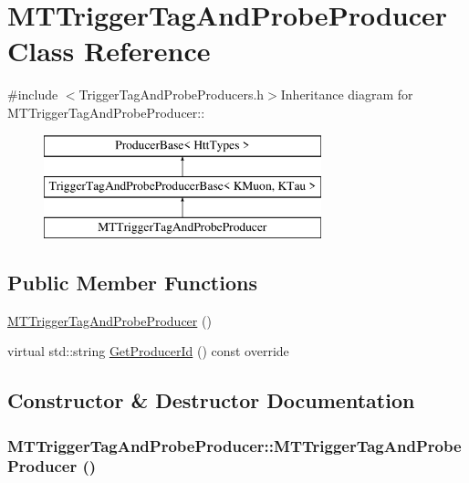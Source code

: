\hypertarget{classMTTriggerTagAndProbeProducer}{
\section{MTTriggerTagAndProbeProducer Class Reference}
\label{classMTTriggerTagAndProbeProducer}
}


{\ttfamily \#include $<$TriggerTagAndProbeProducers.h$>$}Inheritance diagram for MTTriggerTagAndProbeProducer::\begin{figure}[H]
\begin{center}
\leavevmode
\includegraphics[height=3cm]{classMTTriggerTagAndProbeProducer}
\end{center}
\end{figure}
\subsection*{Public Member Functions}
\begin{DoxyCompactItemize}
\item 
\hyperlink{classMTTriggerTagAndProbeProducer_a6662f0b3c23290d8247cc5fc4a3ed9c7}{MTTriggerTagAndProbeProducer} ()
\item 
virtual std::string \hyperlink{classMTTriggerTagAndProbeProducer_a6f6e0acf339e563d7e0b697abc53bac2}{GetProducerId} () const override
\end{DoxyCompactItemize}


\subsection{Constructor \& Destructor Documentation}
\hypertarget{classMTTriggerTagAndProbeProducer_a6662f0b3c23290d8247cc5fc4a3ed9c7}{
\subsubsection[{MTTriggerTagAndProbeProducer}]{\setlength{\rightskip}{0pt plus 5cm}MTTriggerTagAndProbeProducer::MTTriggerTagAndProbeProducer ()}}
\label{classMTTriggerTagAndProbeProducer_a6662f0b3c23290d8247cc5fc4a3ed9c7}


